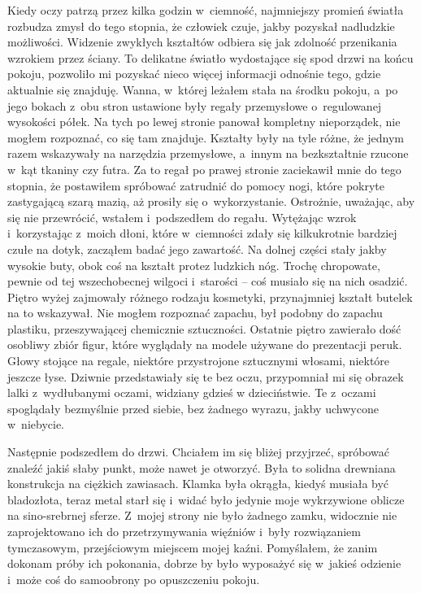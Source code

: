 Kiedy oczy patrzą przez kilka godzin w~ciemność, najmniejszy promień światła rozbudza zmysł do tego stopnia, że człowiek czuje, jakby pozyskał nadludzkie możliwości. Widzenie zwykłych kształtów odbiera się jak zdolność przenikania wzrokiem przez ściany. To delikatne światło wydostające się spod drzwi na końcu pokoju, pozwoliło mi pozyskać nieco więcej informacji odnośnie tego, gdzie aktualnie się znajduję. Wanna, w~której leżałem stała na środku pokoju, a~po jego bokach z~obu stron ustawione były regały przemysłowe o~regulowanej wysokości półek. Na tych po lewej stronie panował kompletny nieporządek, nie mogłem rozpoznać, co się tam znajduje. Kształty były na tyle różne, że jednym razem wskazywały na narzędzia przemysłowe, a~innym na bezkształtnie rzucone w~kąt tkaniny czy futra. Za to regał po prawej stronie zaciekawił mnie do tego stopnia, że postawiłem spróbować zatrudnić do pomocy nogi, które pokryte zastygającą szarą mazią, aż prosiły się o~wykorzystanie. Ostrożnie, uważając, aby się nie przewrócić, wstałem i~podszedłem do regału. Wytężając wzrok i~korzystając z~moich dłoni, które w~ciemności zdały się kilkukrotnie bardziej czułe na dotyk, zacząłem badać jego zawartość. Na dolnej części stały jakby wysokie buty, obok coś na kształt protez ludzkich nóg. Trochę chropowate, pewnie od tej wszechobecnej wilgoci i~starości -- coś musiało się na nich osadzić. Piętro wyżej zajmowały różnego rodzaju kosmetyki, przynajmniej kształt butelek na to wskazywał. Nie mogłem rozpoznać zapachu, był podobny do zapachu plastiku, przeszywającej chemicznie sztuczności. Ostatnie piętro zawierało dość osobliwy zbiór figur, które wyglądały na modele używane do prezentacji peruk. Głowy stojące na regale, niektóre przystrojone sztucznymi włosami, niektóre jeszcze łyse. Dziwnie przedstawiały się te bez oczu, przypomniał mi się obrazek lalki z~wydłubanymi oczami, widziany gdzieś w dzieciństwie. Te z~oczami spoglądały bezmyślnie przed siebie, bez żadnego wyrazu, jakby uchwycone w~niebycie. 

Następnie podszedłem do drzwi. Chciałem im się bliżej przyjrzeć, spróbować znaleźć jakiś słaby punkt, może nawet je otworzyć. Była to solidna drewniana konstrukcja na ciężkich zawiasach. Klamka była okrągła, kiedyś musiała być bladozłota, teraz metal starł się i~widać było jedynie moje wykrzywione oblicze na sino-srebrnej sferze. Z~mojej strony nie było żadnego zamku, widocznie nie zaprojektowano ich do przetrzymywania więźniów i~były rozwiązaniem tymczasowym, przejściowym miejscem mojej kaźni. Pomyślałem, że zanim dokonam próby ich pokonania, dobrze by było wyposażyć się w~jakieś odzienie i~może coś do samoobrony po opuszczeniu pokoju.

